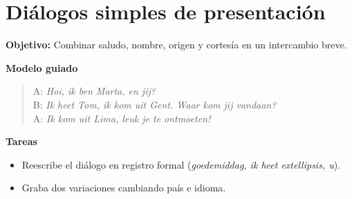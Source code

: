 \section{Diálogos simples de presentación}
\textbf{Objetivo:} Combinar saludo, nombre, origen y cortesía en un intercambio breve.

\textbf{Modelo guiado}
\begin{quote}
A: \textit{Hoi, ik ben Marta, en jij?}\\
B: \textit{Ik heet Tom, ik kom uit Gent. Waar kom jij vandaan?}\\
A: \textit{Ik kom uit Lima, leuk je te ontmoeten!}
\end{quote}

\textbf{Tareas}
\begin{itemize}[leftmargin=*]
  \item Reescribe el diálogo en registro formal (\textit{goedemiddag, ik heet	extellipsis{}, u}).
  \item Graba dos variaciones cambiando país e idioma.
\end{itemize}
